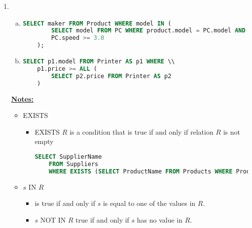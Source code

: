 \documentclass[12pt]{article}
\begin{document}
\begin{enumerate}[1.]
\begin{enumerate}[a)]
    \end{enumerate}

    \item

    \begin{enumerate}[a)]
        \item

    \begin{lstlisting}[language=SQL]
    SELECT maker FROM Product WHERE model IN (
        SELECT model FROM PC WHERE product.model = PC.model AND
        PC.speed >= 3.0
    );
    \end{lstlisting}


        \item

    \begin{lstlisting}[language=SQL]
    SELECT p1.model FROM Printer AS p1 WHERE \\
    p1.price >= ALL (
        SELECT p2.price FROM Printer AS p2
    )
    \end{lstlisting}
    \end{enumerate}

    \underline{\textbf{Notes:}}

    \bigskip

    \begin{itemize}
        \item EXISTS
        \begin{itemize}
            \item EXISTS $R$ is a condition that is true if and only if relation $R$ is not empty

            \bigskip

    \begin{lstlisting}[language=SQL]
    SELECT SupplierName
    FROM Suppliers
    WHERE EXISTS (SELECT ProductName FROM Products WHERE Products.SupplierID = Suppliers.supplierID AND Price = 22);
    \end{lstlisting}

        \end{itemize}

        \item $s$ IN $R$
        \begin{itemize}
            \item is true if and only if $s$ is equal to one of the values in $R$.
            \item $s$ NOT IN $R$ true if and only if $s$ has no value in $R$.
        \end{itemize}


\end{itemize}
\end{enumerate}
\end{document}
